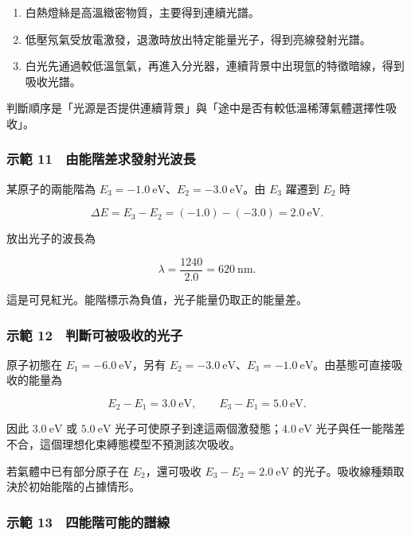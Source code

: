 \documentclass[11pt,a4paper]{article}
\providecommand{\tightlist}{%
  \setlength{\itemsep}{0pt}\setlength{\parskip}{0pt}}
\begin{document}
\begin{enumerate}
\def\labelenumi{\arabic{enumi}.}
\tightlist
\item
  白熱燈絲是高溫緻密物質，主要得到連續光譜。
\item
  低壓氖氣受放電激發，退激時放出特定能量光子，得到亮線發射光譜。
\item
  白光先通過較低溫氫氣，再進入分光器，連續背景中出現氫的特徵暗線，得到吸收光譜。
\end{enumerate}

判斷順序是「光源是否提供連續背景」與「途中是否有較低溫稀薄氣體選擇性吸收」。

\subsubsection{示範 11　由能階差求發射光波長}\label{ux793aux7bc4-11-ux7531ux80fdux968eux5deeux6c42ux767cux5c04ux5149ux6ce2ux9577}

某原子的兩能階為 \(E_3=-1.0\ \mathrm{eV}\)、\(E_2=-3.0\ \mathrm{eV}\)。由 \(E_3\) 躍遷到 \(E_2\) 時

\[
\Delta E=E_3-E_2=(-1.0)-(-3.0)=2.0\ \mathrm{eV}.
\]

放出光子的波長為

\[
\lambda=\frac{1240}{2.0}=620\ \mathrm{nm}.
\]

這是可見紅光。能階標示為負值，光子能量仍取正的能量差。

\subsubsection{示範 12　判斷可被吸收的光子}\label{ux793aux7bc4-12-ux5224ux65b7ux53efux88abux5438ux6536ux7684ux5149ux5b50}

原子初態在 \(E_1=-6.0\ \mathrm{eV}\)，另有 \(E_2=-3.0\ \mathrm{eV}\)、\(E_3=-1.0\ \mathrm{eV}\)。由基態可直接吸收的能量為

\[
E_2-E_1=3.0\ \mathrm{eV},
\qquad
E_3-E_1=5.0\ \mathrm{eV}.
\]

因此 \(3.0\ \mathrm{eV}\) 或 \(5.0\ \mathrm{eV}\) 光子可使原子到達這兩個激發態；\(4.0\ \mathrm{eV}\) 光子與任一能階差不合，這個理想化束縛態模型不預測該次吸收。

若氣體中已有部分原子在 \(E_2\)，還可吸收 \(E_3-E_2=2.0\ \mathrm{eV}\) 的光子。吸收線種類取決於初始能階的占據情形。

\subsubsection{示範 13　四能階可能的譜線}\label{ux793aux7bc4-13-ux56dbux80fdux968eux53efux80fdux7684ux8b5cux7dda}
\end{document}
